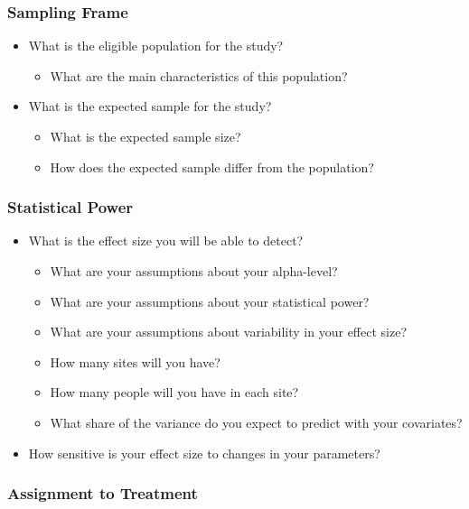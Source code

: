 \documentclass[12pt]{article}
\begin{document}
\subsubsection{Sampling Frame}

\begin{itemize}
\item What is the eligible population for the study?
\begin{itemize}
\item What are the main characteristics of this population?
\end{itemize}
\item What is the expected sample for the study?
\begin{itemize}
\item What is the expected sample size?
\item How does the expected sample differ from the population?
\end{itemize}
\end{itemize}

\subsubsection{Statistical Power}

\begin{itemize}
\item What is the effect size you will be able to detect?
\begin{itemize} 
\item What are your assumptions about your alpha-level?
\item What are your assumptions about your statistical power?
\item What are your assumptions about variability in your effect size?
\item How many sites will you have?
\item How many people will you have in each site?
\item What share of the variance do you expect to predict with your covariates?
\end{itemize}
\item How sensitive is your effect size to changes in your parameters?
\end{itemize}

\subsubsection{Assignment to Treatment}
\end{document}
